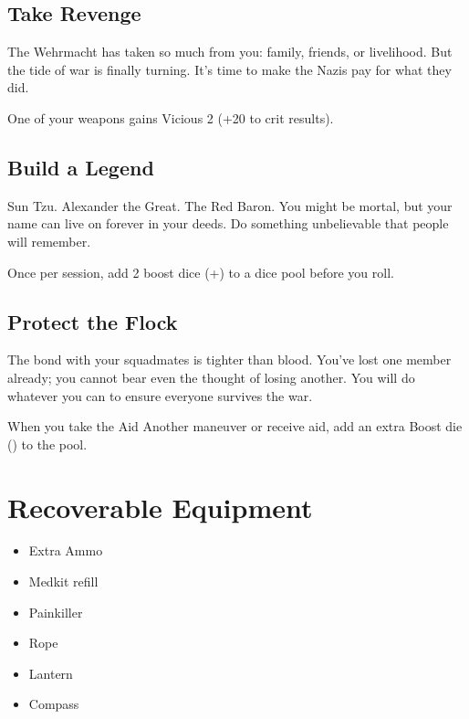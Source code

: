 \documentclass{book}
\newcommand{\bbb}{\BoostDie }
\begin{document}
\begin{multicols}{2}

\subsection{Take Revenge}

The Wehrmacht has taken so much from you: family, friends, or livelihood.  But the tide of war is finally turning.  It's time to make the Nazis pay for what they did.

One of your weapons gains Vicious 2 (+20 to crit results).

\subsection{Build a Legend}

Sun Tzu.  Alexander the Great.  The Red Baron.  You might be mortal, but your name can live on forever in your deeds.  Do something unbelievable that people will remember.

Once per session, add 2 boost dice (+\bbb\bbb) to a dice pool before you roll.

\subsection{Protect the Flock}

The bond with your squadmates is tighter than blood.  You've lost one member already; you cannot bear even the thought of losing another.  You will do whatever you can to ensure everyone survives the war.

When you take the Aid Another maneuver or receive aid, add an extra Boost die (\bbb) to the pool.

\section{Recoverable Equipment}

\begin{itemize}
    \item Extra Ammo
    \item Medkit refill
    \item Painkiller
    \item Rope
    \item Lantern
    \item Compass
\end{itemize}


\end{multicols}
\end{document}
